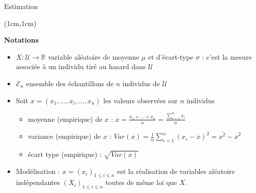 \documentclass{beamer}
\newcommand{\R}{\mathbb{R}}
\newcommand{\pop}{\mathcal{U}} %
\begin{document}
\begin{frame}{Estimation}
\begin{textblock*}{\textwidth}(1cm,1cm)

\begin{center}{\bf \Large Notations} \end{center}

\begin{itemize}
\item $X : \mathcal{U}\to\R$ variable aléatoire de moyenne $\mu$  et d'écart-type $\sigma$ : c'est la mesure associée à un individu tiré au hasard dans $\pop$

\item $\mathcal{E}_n$ ensemble des échantillons de $n$ individus de $\pop$ 

\item Soit $x=(x_1,\hdots, x_i, \hdots, x_n)$ les valeurs observées sur $n$ individus

	\begin{itemize}
	\item moyenne (empirique) de $x$ :
$\displaystyle \overline{x}=\frac{x_1+\hdots + x_n}{n} = \frac{\sum_{i=1}^n x_i}{n}$
	
	\item variance (empirique) de $x$ :
$\displaystyle  Var(x)=\frac{1}{n} \sum_{i=1}^n (x_i - \overline{x})^2 = \overline{x^2} - \overline{x}^2$
	
	\item écart type (empirique) : $\displaystyle  \sqrt{Var(x)}$ 
	\end{itemize}
\item Modélisation : $x = (x_i)_{1\leq i\leq n}$ est la réalisation de variables aléatoire indépendantes $(X_i)_{1\leq i\leq n}$ toutes de même loi que $X$.
\end{itemize}

\end{textblock*}
\end{frame}
 
\end{document}
